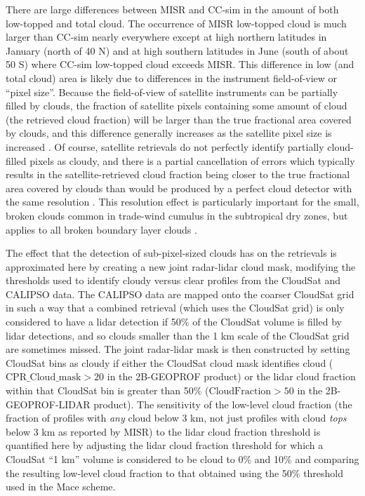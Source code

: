 There are large differences between MISR and CC-sim in the amount of
both low-topped and total cloud. The occurrence of MISR low-topped cloud
is much larger than CC-sim nearly everywhere except at high northern
latitudes in January (north of 40 N) and at high southern latitudes in
June (south of about 50 S) where CC-sim low-topped cloud exceeds MISR.
This difference in low (and total cloud) area is likely due to
differences in the instrument field-of-view or ``pixel size''. Because
the field-of-view of satellite instruments can be partially filled by
clouds, the fraction of satellite pixels containing some amount of cloud
(the retrieved cloud fraction) will be larger than the true fractional
area covered by clouds, and this difference generally increases as the
satellite pixel size is increased \citep{digirolamo_and_davies_1997}. Of
course, satellite retrievals do not perfectly identify partially
cloud-filled pixels as cloudy, and there is a partial cancellation of
errors which typically results in the satellite-retrieved cloud fraction
being closer to the true fractional area covered by clouds than would be
produced by a perfect cloud detector with the same resolution
\citep{wielicki_and_parker_1992}. This resolution effect is particularly
important for the small, broken clouds common in trade-wind cumulus in
the subtropical dry zones, but applies to all broken boundary layer
clouds \citep{zhao_and_digirolamo_2006, marchand_et_al_2010}.

The effect that the detection of sub-pixel-sized clouds has on the
retrievals is approximated here by creating a new joint radar-lidar
cloud mask, modifying the thresholds used to identify cloudy versus
clear profiles from the CloudSat and CALIPSO data. The CALIPSO data are
mapped onto the coarser CloudSat grid in such a way that a combined
retrieval (which uses the CloudSat grid) is only considered to have a
lidar detection if 50\% of the CloudSat volume is filled by lidar
detections, and so clouds smaller than the 1 km scale of the CloudSat
grid are sometimes missed. The joint radar-lidar mask is then
constructed by setting CloudSat bins as cloudy if either the CloudSat
cloud mask identifies cloud (\(\textrm{CPR\_Cloud\_mask} > 20\) in the
2B-GEOPROF product) or the lidar cloud fraction within that CloudSat bin
is greater than 50\% (\(\textrm{CloudFraction} > 50\) in the
2B-GEOPROF-LIDAR product). The sensitivity of the low-level cloud
fraction (the fraction of profiles with \emph{any} cloud below 3 km, not
just profiles with cloud \emph{tops} below 3 km as reported by MISR) to
the lidar cloud fraction threshold is quantified here by adjusting the
lidar cloud fraction threshold for which a CloudSat ``1 km'' volume is
considered to be cloud to 0\% and 10\% and comparing the resulting
low-level cloud fraction to that obtained using the 50\% threshold used
in the Mace scheme.

